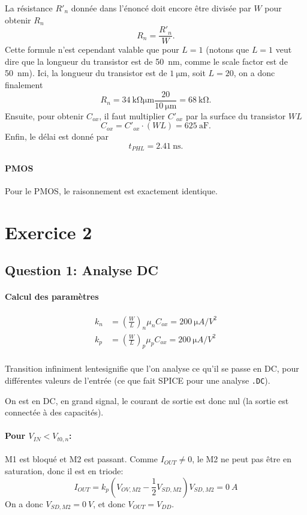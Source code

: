 \documentclass[frenchb,DIV=14]{scrartcl}
\begin{document}
La résistance $R'_n$ donnée dans l'énoncé doit encore être divisée par $W$ pour
obtenir $R_n$
\[ R_n = \frac{R'_n}{W}. \]
Cette formule n'est cependant valable que pour $L=1$ (notons que $L=1$ veut
dire que la longueur du transistor est de \SI{50}{\nano\meter}, comme le
scale factor est de \SI{50}{\nano\meter}). Ici, la longueur du transistor
est de $\SI{1}{\micro\meter}$, soit $L=20$, on a donc finalement
\[ R_n = \SI{34}{\kilo\ohm\micro\meter}\frac{20}{\SI{10}{\micro\meter}} =
\SI{68}{\kilo\ohm}. \]
Ensuite, pour obtenir $C_{ox}$, il faut multiplier $C'_{ox}$ par la surface du
transistor $WL$
\[ C_{ox} = C'_{ox}\cdot(WL) = \SI{625}{\atto\farad}. \]
Enfin, le délai est donné par
\[ t_{PHL} = \SI{2.41}{\nano\second}. \]

\paragraph{PMOS}
Pour le PMOS, le raisonnement est exactement identique.

\section*{Exercice 2}

\subsection*{Question 1: Analyse DC}

\paragraph{Calcul des paramètres}
\begin{align*}
    k_n &= \left(\frac{W}{L}\right)_n \mu_n C_{ox} = \SI{200}{\micro A/V^2} \\
    k_p &= \left(\frac{W}{L}\right)_p \mu_p C_{ox} = \SI{200}{\micro A/V^2} \\
\end{align*}

\og Transition infiniment lente\fg signifie que l'on analyse ce qu'il se passe
en DC, pour différentes valeurs de l'entrée (ce que fait SPICE pour une analyse
\texttt{.DC}).

On est en DC, en grand signal, le courant de sortie est donc nul (la sortie est
connectée à des capacités).

\paragraph{Pour $V_{IN} < V_{t0,n}$:}
M1 est bloqué et M2 est passant.
Comme $I_{OUT} \neq 0$, le M2 ne peut pas être en saturation,
donc il est en triode:
\[I_{OUT} = k_p \left(V_{OV,M2} - \frac{1}{2} V_{SD,M2}\right)V_{SD,M2} = \SI{0}{A}\]
On a donc $V_{SD,M2} = \SI{0}{V}$, et donc $V_{OUT} = V_{DD}$.
\end{document}

